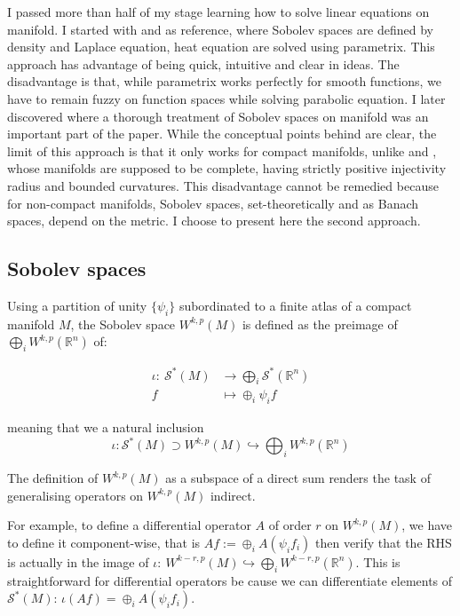 I passed more than half of my stage learning how to solve linear equations on manifold. I
started with \cite{aubin_nonlinear_1998} and \cite{jost_riemannian_2008} as reference, where Sobolev spaces are defined by
density and Laplace equation, heat equation are solved using parametrix. This approach has advantage of
being quick, intuitive and clear in ideas. The disadvantage is that, while parametrix
works perfectly for smooth functions, we have to remain fuzzy on function spaces while
solving parabolic equation. I later discovered \cite{hamilton_harmonic_1975} where a
thorough treatment of Sobolev spaces on manifold was an important part of the paper. While
the conceptual points behind are clear, the limit of this approach is that it only works
for compact manifolds, unlike \cite{aubin_nonlinear_1998} and \cite{jost_riemannian_2008},
whose manifolds are supposed to be complete, having strictly positive injectivity radius
and bounded curvatures. This disadvantage cannot be remedied because for non-compact
manifolds, Sobolev spaces, set-theoretically and as Banach spaces, depend on the metric. I
choose to present here the second approach.

\subsection{Sobolev spaces}
\label{sec:orge6386bd}
Using a partition of unity \(\{\psi_i\}\) subordinated to a finite atlas of a compact manifold \(M\), the Sobolev
space \(W^{k,p}(M)\) is defined as the preimage of \(\bigoplus_i W^{k,p}(\mathbb{R}^n)\) of:

\begin{align}
\label{eq:intro:2.5}
  \iota:\ \mathcal{S}^*(M) &\longrightarrow \bigoplus_i \mathcal{S}^*(\mathbb{R}^n) \\
  	  f &\longmapsto \oplus_i \psi_i f \nonumber
\end{align}

meaning that we a natural inclusion
\begin{equation}
\label{eq:intro:3}
\iota: \mathcal{S}^*(M)\supset W^{k,p}(M) \hookrightarrow  \bigoplus_i W^{k,p}(\mathbb{R}^n)
\end{equation}

The definition of \(W^{k,p}(M)\) as a subspace of a direct sum renders the task of
generalising operators on \(W^{k,p}(M)\) indirect. 

For example, to define a differential
operator \(A\) of order \(r\) on \(W^{k,p}(M)\), we have to define it
component-wise, that is \(Af:= \oplus_i A(\psi_i f_i)\) then verify that the RHS is
actually in the image of \(\iota:\ W^{k-r,p}(M) \hookrightarrow \bigoplus_i
W^{k-r,p}(\mathbb{R}^n)\). This is straightforward for differential operators be cause we
can differentiate elements of \(\mathcal{S}^*(M)\): \(\iota(Af) = \oplus_i A(\psi_i
f_i)\).

